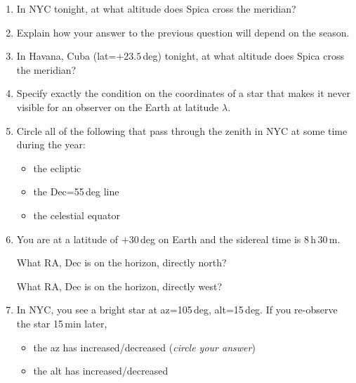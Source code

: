 \documentclass[12pt]{article}
\begin{document}
\begin{enumerate}
\item 
In NYC tonight, at what altitude does Spica cross the meridian?

\vspace{0.5in}

\item
Explain how your answer to the previous question will depend on the
season.

\vspace{1in}

\item
In Havana, Cuba (lat=$+23.5$\,deg) tonight, at what altitude does
Spica cross the meridian?

\vspace{0.5in}

\item
Specify exactly the condition on the coordinates of a star that makes
it never visible for an observer on the Earth at latitude $\lambda$.

\vspace{1in}

\item
Circle all of the following that pass through the zenith in NYC at
some time during the year:
\begin{itemize}
\item the ecliptic
\item the Dec=55\,deg line
\item the celestial equator
\end{itemize}

\item 
You are at a latitude of $+30$\,deg on Earth and the sidereal time is
8\,h\,30\,m.

What RA, Dec is on the horizon, directly north?

\vspace{0.5in}

What RA, Dec is on the horizon, directly west?

\vspace{0.5in}

\item
In NYC, you see a bright star at az=105\,deg, alt=15\,deg. If you
re-observe the star 15\,min later,
\begin{itemize}
\item the az has increased/decreased (\emph{circle your answer})
\item the alt has increased/decreased
\end{itemize}


\end{enumerate}
\end{document}
